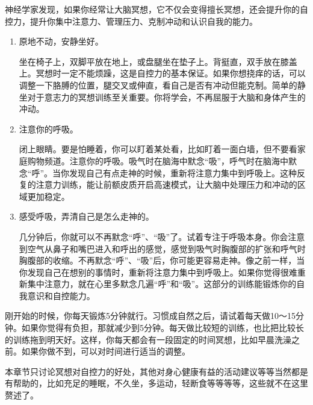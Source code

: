 \documentclass[12pt,oneside]{book}
\begin{document}
\begin{bookref}[frametitle={\cite{自控力}}]
神经学家发现，如果你经常让大脑冥想，它不仅会变得擅长冥想，还会提升你的自控力，提升你集中注意力、管理压力、克制冲动和认识自我的能力。

\begin{enumerate}
\item 原地不动，安静坐好。

坐在椅子上，双脚平放在地上，或盘腿坐在垫子上。背挺直，双手放在膝盖上。冥想时一定不能烦躁，这是自控力的基本保证。如果你想挠痒的话，可以调整一下胳膊的位置，腿交叉或伸直，看自己是否有冲动但能克制。简单的静坐对于意志力的冥想训练至关重要。你将学会，不再屈服于大脑和身体产生的冲动。

\item 注意你的呼吸。

闭上眼睛。要是怕睡着，你可以盯着某处看，比如盯着一面白墙，但不要看家庭购物频道。注意你的呼吸。吸气时在脑海中默念“吸”，呼气时在脑海中默念“呼”。当你发现自己有点走神的时候，重新将注意力集中到呼吸上。这种反复的注意力训练，能让前额皮质开启高速模式，让大脑中处理压力和冲动的区域更加稳定。

\item 感受呼吸，弄清自己是怎么走神的。

几分钟后，你就可以不再默念“呼”、“吸”了。试着专注于呼吸本身。你会注意到空气从鼻子和嘴巴进入和呼出的感觉，感觉到吸气时胸腹部的扩张和呼气时胸腹部的收缩。不再默念“呼”、“吸”后，你可能更容易走神。像之前一样，当你发现自己在想别的事情时，重新将注意力集中到呼吸上。如果你觉得很难重新集中注意力，就在心里多默念几遍“呼”和“吸”。这部分的训练能锻炼你的自我意识和自控能力。
\end{enumerate}


刚开始的时候，你每天锻炼5分钟就行。习惯成自然之后，请试着每天做10～15分钟。如果你觉得有负担，那就减少到5分钟。每天做比较短的训练，也比把比较长的训练拖到明天好。这样，你每天都会有一段固定的时间冥想，比如早晨洗澡之前。如果你做不到，可以对时间进行适当的调整。

\end{bookref}

本章节只讨论冥想对自控力的好处，其他对身心健康有益的活动建议等等当然都是有帮助的，比如充足的睡眠，不久坐，多运动，轻断食等等等等，这些就不在这里赘述了。
\end{document}
